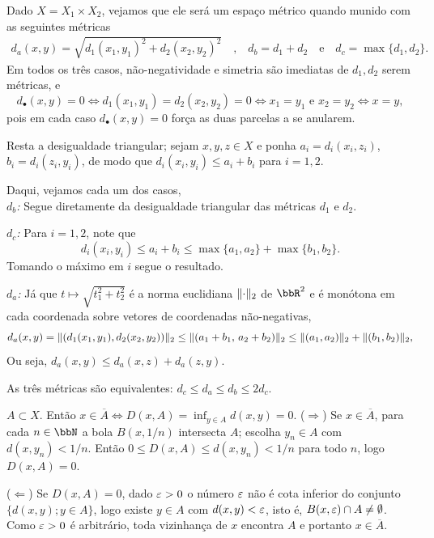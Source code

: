 \begin{exercicio}{Dado $X=X_1\times X_2$, vejamos que ele será um espaço métrico quando munido com as seguintes métricas 
\begin{align*}
 d_a(x,y)=\sqrt{d_1(x_1,y_1)^2+d_2(x_2,y_2)^2} \quad \text{,} \quad d_b = d_1+d_2 \quad \text{e} \quad d_c=\max\{d_1,d_2\}.
\end{align*}
}
Em todos os três casos, não-negatividade e simetria são imediatas de $d_1,d_2$ serem métricas, e
\[ d_\bullet(x,y)=0 \iff d_1(x_1,y_1)=d_2(x_2,y_2)=0 \iff x_1=y_1 \text{ e } x_2=y_2 \iff x=y, \]
pois em cada caso $d_\bullet(x,y)=0$ força as duas parcelas a se anularem. 

Resta a desigualdade triangular; sejam $x,y,z\in X$ e ponha $a_i=d_i(x_i,z_i)$, $b_i=d_i(z_i,y_i)$, de modo que $d_i(x_i,y_i)\le a_i+b_i$ para $i=1,2$.
  \vspace{4mm} 

Daqui, vejamos cada um dos casos,\\ 
\emph{$d_b$:} Segue diretamente da desigualdade triangular das métricas 
  $d_1$ e $d_2$.

\emph{$d_c$:} Para $i=1,2$, note que 
  $$d_i(x_i,y_i)\le a_i+b_i \le \max\{a_1,a_2\}+\max\{b_1,b_2\}.$$ 
Tomando o máximo em $i$ segue o resultado.

\emph{$d_a$:} Já que $t\mapsto \sqrt{t_1^2+t_2^2}$ é a norma euclidiana $\lVert\cdot\rVert_2$ de $\R^2$ e é monótona em cada coordenada sobre vetores de coordenadas não-negativas,
\[ d_a(x,y)=\lVert(d_1(x_1,y_1),d_2(x_2,y_2))\rVert_2 \le \lVert(a_1+b_1,\,a_2+b_2)\rVert_2 \le \lVert(a_1,a_2)\rVert_2+\lVert(b_1,b_2)\rVert_2, \]
Ou seja, $d_a(x,y)\le d_a(x,z)+d_a(z,y)$.

\begin{obs}
As três métricas são equivalentes: $d_c\le d_a\le d_b\le 2d_c$.
\end{obs}
\end{exercicio}

\begin{exercicio}{$A\subset X$. Então $x\in\overline{A} \iff D(x,A)=\inf_{y\in A} d(x,y)=0$.}
\sol
($\Rightarrow$) Se $x\in\overline{A}$, para cada $n\in\N$ a bola $B(x,1/n)$ intersecta $A$; escolha $y_n\in A$ com $d(x,y_n)<1/n$. Então $0\le D(x,A)\le d(x,y_n)<1/n$ para todo $n$, logo $D(x,A)=0$.

($\Leftarrow$) Se $D(x,A)=0$, dado $\varepsilon>0$ o número $\varepsilon$ não é cota inferior do conjunto $\{d(x,y);y\in A\}$, logo existe $y\in A$ com $d(x,y)<\varepsilon$, isto é, $B(x,\varepsilon)\cap A\neq\emptyset$. Como $\varepsilon>0$ é arbitrário, toda vizinhança de $x$ encontra $A$ e portanto $x\in\overline{A}$.
\end{exercicio}

